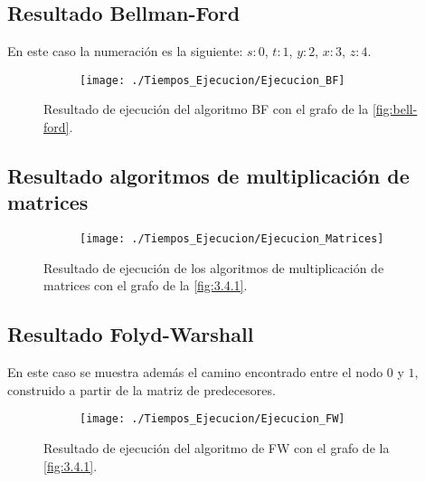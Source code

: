 \newpage

\subsection{Resultado Bellman-Ford}

En este caso la numeración es la siguiente: $s:0$, $t:1$, $y:2$, $x:3$, $z:4$.

\begin{figure}[!htb]
	\centering
	\begin{subfigure}{\linewidth}
		\texttt{[image: ./Tiempos\_Ejecucion/Ejecucion\_BF]}
	\end{subfigure}
	
	\caption{Resultado de ejecución del algoritmo BF con el grafo de la \autoref{fig:bell-ford}.}
	\label{fig:resultado_BF}
\end{figure}

\subsection{Resultado algoritmos de multiplicación de matrices}

\begin{figure}[!htb]
	\centering
	\begin{subfigure}{\linewidth}
		\texttt{[image: ./Tiempos\_Ejecucion/Ejecucion\_Matrices]}
	\end{subfigure}
	
	\caption{Resultado de ejecución de los algoritmos de multiplicación de matrices con el grafo de la \autoref{fig:3.4.1}.}
	\label{fig:resultado_Matrices}
\end{figure}

\newpage

\subsection{Resultado Folyd-Warshall}

En este caso se muestra además el camino encontrado entre el nodo $0$ y $1$, construido a partir de la matriz de predecesores.

\begin{figure}[!htb]
	\centering
	\begin{subfigure}{\linewidth}
		\texttt{[image: ./Tiempos\_Ejecucion/Ejecucion\_FW]}
	\end{subfigure}
	
	\caption{Resultado de ejecución del algoritmo de FW con el grafo de la \autoref{fig:3.4.1}.}
	\label{fig:resultado_FW}
\end{figure}

